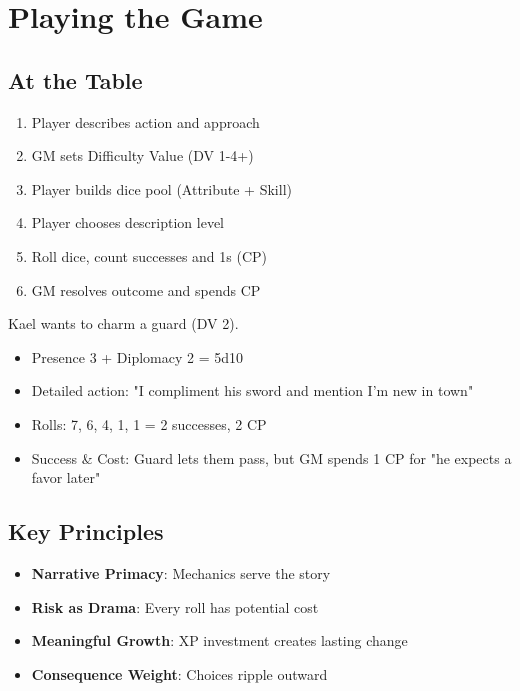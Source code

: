\documentclass[11pt]{article}
\begin{document}
\section{Playing the Game}

\subsection{At the Table}
\begin{enumerate}
    \item Player describes action and approach
    \item GM sets Difficulty Value (DV 1-4+)
    \item Player builds dice pool (Attribute + Skill)
    \item Player chooses description level
    \item Roll dice, count successes and 1s (CP)
    \item GM resolves outcome and spends CP
\end{enumerate}

\begin{examplebox}
Kael wants to charm a guard (DV 2).
\begin{itemize}
    \item Presence 3 + Diplomacy 2 = 5d10
    \item Detailed action: "I compliment his sword and mention I'm new in town"
    \item Rolls: 7, 6, 4, 1, 1 = 2 successes, 2 CP
    \item Success \& Cost: Guard lets them pass, but GM spends 1 CP for "he expects a favor later"
\end{itemize}
\end{examplebox}

\subsection{Key Principles}
\begin{itemize}
    \item \textbf{Narrative Primacy}: Mechanics serve the story
    \item \textbf{Risk as Drama}: Every roll has potential cost
    \item \textbf{Meaningful Growth}: XP investment creates lasting change
    \item \textbf{Consequence Weight}: Choices ripple outward
\end{itemize}
\end{document}
